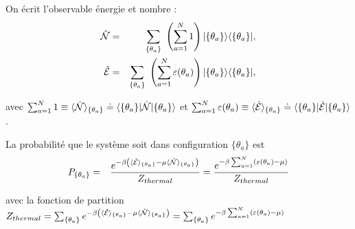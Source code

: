 \begin{figure}[H]
	\centering 
	\captionsetup{skip=10pt} %
\end{figure}



On écrit l'observable énergie et nombre :
	\begin{eqnarray}
		\operator{\mathcal{N}} & = & \sum_{ \{\theta_a\} }   \left ( \sum_{a = 1}^N  1 \right )  \vert \{ \theta_a\}\rangle	\langle \{ \theta_a \}\vert,\\
		\operator{\mathcal{E}} & = & \sum_{\{ \theta_a\}}  \left ( \sum_{a = 1}^N  \varepsilon ( \theta_a ) \right )   \vert \{ \theta_a\}\rangle	\langle \{ \theta_a \}\vert,		
	\end{eqnarray}
	
	avec $\sum_{a = 1}^N 1 \equiv \langle \hat{\mathbf{\mathcal{N}}} \rangle_{ \{\theta_a \} }  \doteq  \langle \{ \theta_a \}\vert  \hat{\mathbf{\mathcal{N}}} \vert\{ \theta_a\}\rangle  $ et $  \sum_{a = 1}^N  \varepsilon ( \theta_a ) \equiv \langle \hat{\mathbf{\mathcal{E}}} \rangle_{\{\theta_a \}}  \doteq  \langle \{ \theta_a \}\vert  \hat{\mathbf{ \mathcal{E}}}  \vert\{ \theta_a\}\rangle $.

	
	La probabilité que le système soit dans configuration $\{ \theta_a \}$  est 
	\begin{eqnarray}
		P_{\{\theta_a \}} & = & \frac{e^{- \beta \left ( \langle \hat{\mathbf{\mathcal{E}}} \rangle_{\{\theta_a \}}   - \mu \langle \hat{\mathbf{\mathcal{N}}} \rangle_{\{\theta_a \}} \right )}}{Z_{thermal}} = \frac{e^{- \beta \sum_{a=1}^N  ( \varepsilon( \theta_a )   - \mu  )}}{Z_{thermal}}	
	\end{eqnarray}
	
	avec la fonction de partition $Z_{thermal} = \sum_{\{ \theta_a\}}e^{- \beta \left ( \langle \hat{\mathbf{\mathcal{E}}} \rangle_{\{\theta_a \}}   - \mu \langle \hat{\mathbf{\mathcal{N}}} \rangle_{\{\theta_a \}} \right )} = \sum_{\{ \theta_a\}} e^{- \beta \sum_{a=1}^N  ( \varepsilon( \theta_a )   - \mu  )}$
	
